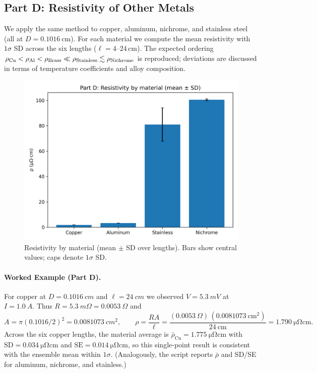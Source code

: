 \documentclass[12pt]{article}
\numberwithin{equation}{section}
\begin{document}
\subsection{Part D: Resistivity of Other Metals}
We apply the same method to copper, aluminum, nichrome, and stainless steel (all at $D=\SI{0.1016}{\centi\metre}$). For each material we compute the mean resistivity with $1\sigma$ SD across the six lengths ($\ell=4\text{–}24$\,cm). The expected ordering $\rho_{\rm Cu}<\rho_{\rm Al}<\rho_{\rm Brass}\ll\rho_{\rm Stainless}\lesssim\rho_{\rm Nichrome}$ is reproduced; deviations are discussed in terms of temperature coefficients and alloy composition.
\begin{figure}[h]
  \centering
  \includegraphics[width=0.72\linewidth]{figs/PartD_rho_by_material.png}
  \caption{Resistivity by material (mean $\pm$ SD over lengths). Bars show central values; caps denote $1\sigma$ SD.}
  \label{fig:partD}
\end{figure}
\FloatBarrier

\paragraph*{Worked Example (Part D).}
For copper at $D=\SI{0.1016}{cm}$ and $\ell=\SI{24}{cm}$ we observed $V=\SI{5.3}{mV}$ at $I=\SI{1.0}{A}$.
Thus $R=\SI{5.3}{m\Omega}=\SI{0.0053}{\Omega}$ and
\[
A=\pi(0.1016/2)^2=\SI{0.0081073}{cm^2},\qquad
\rho=\frac{RA}{\ell}=\frac{(0.0053\ \Omega)\,(0.0081073\ \mathrm{cm^2})}{24\ \mathrm{cm}}
=\boxed{\SI{1.790}{\micro\ohm\centi\metre}}.
\]
Across the six copper lengths, the material average is
$\bar\rho_{\text{Cu}}=\SI{1.775}{\micro\ohm\centi\metre}$ with
$\mathrm{SD}=\SI{0.034}{\micro\ohm\centi\metre}$ and
$\mathrm{SE}=\SI{0.014}{\micro\ohm\centi\metre}$,
so this single-point result is consistent with the ensemble mean within $1\sigma$.
(Analogously, the script reports $\bar\rho$ and SD/SE for aluminum, nichrome, and stainless.)
\end{document}
